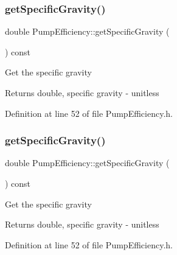 \subsubsection{\texorpdfstring{get\+Specific\+Gravity()}{getSpecificGravity()}\hspace{0.1cm}{\footnotesize\ttfamily [2/3]}}
{\footnotesize\ttfamily double Pump\+Efficiency\+::get\+Specific\+Gravity (\begin{DoxyParamCaption}{ }\end{DoxyParamCaption}) const\hspace{0.3cm}{\ttfamily [inline]}}

Get the specific gravity

\begin{DoxyReturn}{Returns}
double, specific gravity -\/ unitless 
\end{DoxyReturn}


Definition at line 52 of file Pump\+Efficiency.\+h.

\mbox{\label{class_pump_efficiency_a6eeeabb70d99a79a636f35ca74d8ec05}} 
\subsubsection{\texorpdfstring{get\+Specific\+Gravity()}{getSpecificGravity()}\hspace{0.1cm}{\footnotesize\ttfamily [3/3]}}
{\footnotesize\ttfamily double Pump\+Efficiency\+::get\+Specific\+Gravity (\begin{DoxyParamCaption}{ }\end{DoxyParamCaption}) const\hspace{0.3cm}{\ttfamily [inline]}}

Get the specific gravity

\begin{DoxyReturn}{Returns}
double, specific gravity -\/ unitless 
\end{DoxyReturn}


Definition at line 52 of file Pump\+Efficiency.\+h.

\mbox{\label{class_pump_efficiency_aad051c44f6bdbc6108f2c40450c9d510}} 
